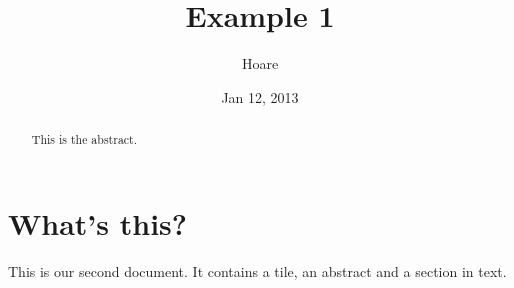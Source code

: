 \documentclass[a4paper,10pt]{article}
\title{Example 1}
\author{Hoare}
\date{Jan 12, 2013}
\begin{document}
\maketitle

\begin{abstract}
This is the abstract.
\end{abstract}

\section{What's this?}
This is our second document. It contains a tile, an abstract and a section in text.
\end{document}
